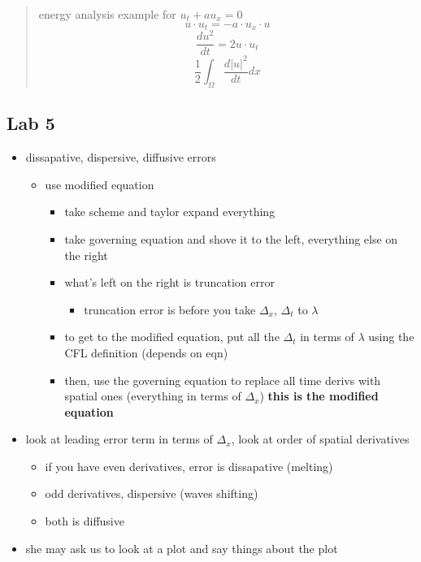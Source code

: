 \documentclass[
]{article}
\providecommand{\tightlist}{%
  \setlength{\itemsep}{0pt}\setlength{\parskip}{0pt}}
\begin{document}
\begin{quote}
energy analysis example for \(u_t + a u_x = 0\)
\[ u \cdot u_t = - a \cdot u_x \cdot u \]
\[ \frac{d u^2}{dt} = 2 u \cdot u_t \]
\[ \frac{1}{2} \int_\Omega \frac{d|u|^2}{dt} d x \]
\end{quote}

\hypertarget{lab-5}{%
\subsection{Lab 5}\label{lab-5}}

\begin{itemize}
\tightlist
\item
  dissapative, dispersive, diffusive errors

  \begin{itemize}
  \tightlist
  \item
    use modified equation

    \begin{itemize}
    \tightlist
    \item
      take scheme and taylor expand everything
    \item
      take governing equation and shove it to the left, everything else
      on the right
    \item
      what's left on the right is truncation error

      \begin{itemize}
      \tightlist
      \item
        truncation error is before you take \(\Delta_x\), \(\Delta_t\)
        to \(\lambda\)
      \end{itemize}
    \item
      to get to the modified equation, put all the \(\Delta_t\) in terms
      of \(\lambda\) using the CFL definition (depends on eqn)
    \item
      then, use the governing equation to replace all time derivs with
      spatial ones (everything in terms of \(\Delta_x\)) \textbf{this is
      the modified equation}
    \end{itemize}
  \end{itemize}
\item
  look at leading error term in terms of \(\Delta_x\), look at order of
  spatial derivatives

  \begin{itemize}
  \tightlist
  \item
    if you have even derivatives, error is dissapative (melting)
  \item
    odd derivatives, dispersive (waves shifting)
  \item
    both is diffusive
  \end{itemize}
\item
  she may ask us to look at a plot and say things about the plot


\end{itemize}
\end{document}
